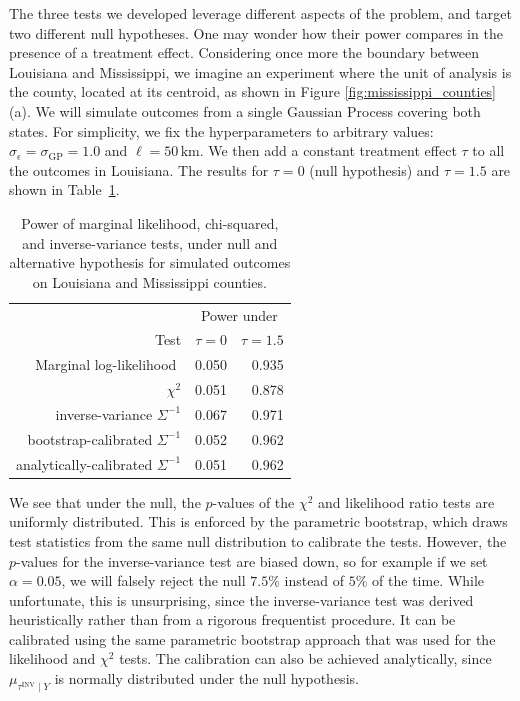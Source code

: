 \documentclass[letter]{article}
\newcommand{\sigmaf}{\sigma_{\mathrm{GP}}}
\newcommand{\sigman}{\sigma_{\epsilon}}
\newcommand{\invvar}{\tau^{\mathrm{INV}}}
\begin{document}
The three tests we developed leverage different aspects of the problem, and target two different null hypotheses. One may wonder how their power compares in the presence of a treatment effect. Considering once more the boundary between Louisiana and Mississippi, we imagine an experiment where the unit of analysis is the county, located at its centroid, as shown in Figure \ref{fig:mississippi_counties}(a).
We will simulate outcomes from a single Gaussian Process covering both states. For simplicity, we fix the hyperparameters to arbitrary values: \(\sigman=\sigmaf=1.0\) and \(\ell=50\,\mathrm{km}\). We then add a constant treatment effect \(\tau\) to all the outcomes in Louisiana. The results for \(\tau=0\) (null hypothesis) and \(\tau=1.5\) are shown in Table~\ref{table:power}.
    

\begin{table}
    \caption{Power of marginal likelihood, chi-squared, and inverse-variance tests, under null and alternative hypothesis for simulated outcomes on Louisiana and Mississippi counties.}
    \label{table:power}
    \centering
    \begin{tabular}{rrr}
        \toprule
        & \multicolumn{2}{c}{Power under} \\
        Test & $\tau=0$ & $\tau=1.5$ \\
        \midrule
        Marginal log-likelihood $ $ & 0.050 & 0.935 \\
        $\chi^2$ & 0.051 & 0.878 \\
        inverse-variance $\Sigma^{-1}$ & 0.067 & 0.971 \\
        bootstrap-calibrated $\Sigma^{-1}$ & 0.052 & 0.962 \\
        analytically-calibrated $\Sigma^{-1}$ & 0.051 & 0.962 \\
        \bottomrule
    \end{tabular}
\end{table}
    	We see that under the null, the \(p\)-values of the \(\chi^2\) and likelihood ratio tests are uniformly distributed. This is enforced by the parametric bootstrap, which draws test statistics from the same null distribution to calibrate the tests. However, the \(p\)-values for the inverse-variance test are biased down, so for example if we set \(\alpha=0.05\), we will falsely reject the null \(7.5\%\) instead of \(5\%\) of the time. While unfortunate, this is unsurprising, since the inverse-variance test was derived heuristically rather than from a rigorous frequentist procedure. It can be calibrated using the same parametric bootstrap approach that was used for the likelihood and \(\chi^2\) tests. The calibration can also be achieved analytically, since \(\mu_{\invvar \mid Y}\) is normally distributed under the null hypothesis.
\end{document}
